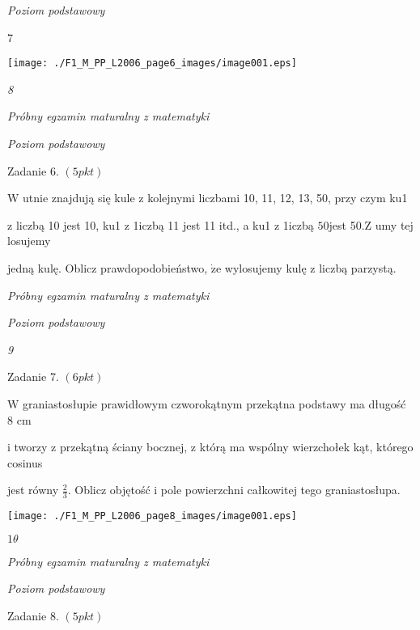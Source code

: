 \documentclass[a4paper,12pt]{article}
\begin{document}
{\it Poziom podstawowy}

7
\begin{center}
\texttt{[image: ./F1\_M\_PP\_L2006\_page6\_images/image001.eps]}
\end{center}




{\it 8}

{\it Próbny egzamin maturalny z matematyki}

{\it Poziom podstawowy}

Zadanie 6. $(5pkt)$

$\mathrm{W}$ utnie znajdują się kule z kolejnymi liczbami 10, 11, 12, 13, 50, przy czym ku1

z liczbą 10 jest 10, ku1 z 1iczbą 11 jest 11 itd., a ku1 z 1iczbą $50$jest 5$0. \mathrm{Z}$ umy tej losujemy

jedną kulę. Oblicz prawdopodobieństwo, $\dot{\mathrm{z}}\mathrm{e}$ wylosujemy kulę z liczbą parzystą.





{\it Próbny egzamin maturalny z matematyki}

{\it Poziom podstawowy}

{\it 9}

Zadanie 7. $(6pkt)$

$\mathrm{W}$ graniastosłupie prawidłowym czworokątnym przekątna podstawy ma długość 8 cm

i tworzy z przekątną ściany bocznej, z którą ma wspólny wierzchołek kąt, którego cosinus

jest równy $\displaystyle \frac{2}{3}$. Oblicz objętość i pole powierzchni całkowitej tego graniastosłupa.
\begin{center}
\texttt{[image: ./F1\_M\_PP\_L2006\_page8\_images/image001.eps]}
\end{center}




$ 1\theta$

{\it Próbny egzamin maturalny z matematyki}

{\it Poziom podstawowy}

Zadanie 8. $(5pkt)$
\end{document}
